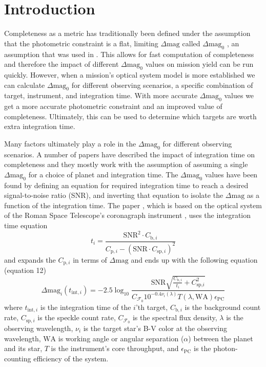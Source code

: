 \section{Introduction}%
\label{sec:ch2_intro}

Completeness as a metric has traditionally been defined under the assumption
that the photometric constraint is a flat, limiting $\Delta\textrm{mag}$ called
$\Delta\textrm{mag}_0$ \citep{brownSingleVisitPhotometric2005}, an assumption
that was used in . This allows for fast computation of
completeness and therefore the impact of different $\Delta\textrm{mag}_0$
values on mission yield can be run quickly. However, when a mission's optical
system model is more established we can calculate $\Delta\textrm{mag}_0$ for
different observing scenarios, a specific combination of target, instrument,
and integration time. With more accurate $\Delta\textrm{mag}_0$ values we get a
more accurate photometric constraint and an improved value of completeness.
Ultimately, this can be used to determine which targets are worth extra
integration time.

Many factors ultimately play a role in the $\Delta\textrm{mag}_0$ for different
observing scenarios. A number of papers have described the impact of
integration time on completeness \citep{hunyadiSingleVisitCompleteness2005,
  brownNewCompletenessMethods2010, starkMaximizingExoEarthCandidate2014,
keithlyOptimalScheduling2020} and they mostly work with the assumption of
assuming a single $\Delta\textrm{mag}_0$ for a choice of planet and integration
time. The $\Delta\textrm{mag}_0$ values have been found by defining an equation
for required integration time to reach a desired signal-to-noise ratio (SNR),
and inverting that equation to isolate the $\Delta\textrm{mag}$ as a function
of the integration time. The paper \citet{keithlyOptimalScheduling2020}, which
is based on the optical system of the Roman Space Telescope's coronagraph
instrument \citep{Nemati2014}, uses the integration time equation
\begin{equation}
  t_i = \frac{\textrm{SNR}^2 \cdot C_{\textrm{b}, i}}{C_{\textrm{p}, i} - \left( \textrm{SNR} \cdot C_{\textrm{sp},i} \right)^2}
  \label{eq:dean_inttime}
\end{equation}
and expands the $C_{\textrm{p}, i}$ in terms of $\Delta\textrm{mag}$ and ends
up with the following equation (equation 12)
\begin{equation}
  \Delta\textrm{mag}_i(t_{\textrm{int},i}) = -2.5 \log_{10} \frac{\textrm{SNR} \sqrt{\frac{C_{\textrm{b},
  i}}{t_i} + C_{\textrm{sp,}i}^2}}{C_{\mathcal{F}_0} 10^{-0.4 \nu_i (\lambda)}
T(\lambda, \textrm{WA}) \epsilon_{\textrm{PC}}}
  \label{eq:dean_dmag}
\end{equation}
where $t_{\textrm{int},i}$ is the integration time of the $i$'th target,
$C_{\textrm{b},i}$ is the background count rate,
$C_{\textrm{sp},i}$ is the speckle count rate,
$C_{\mathcal{F}_0}$ is the spectral flux density,
$\lambda$ is the observing wavelength,
$\nu_i$ is the target star's B-V color at the observing wavelength,
$\textrm{WA}$ is working angle or angular separation ($\alpha$) between the planet and its star,
$T$ is the instrument's core throughput,
and $\epsilon_{\textrm{PC}}$ is the photon-counting efficiency of the system.

